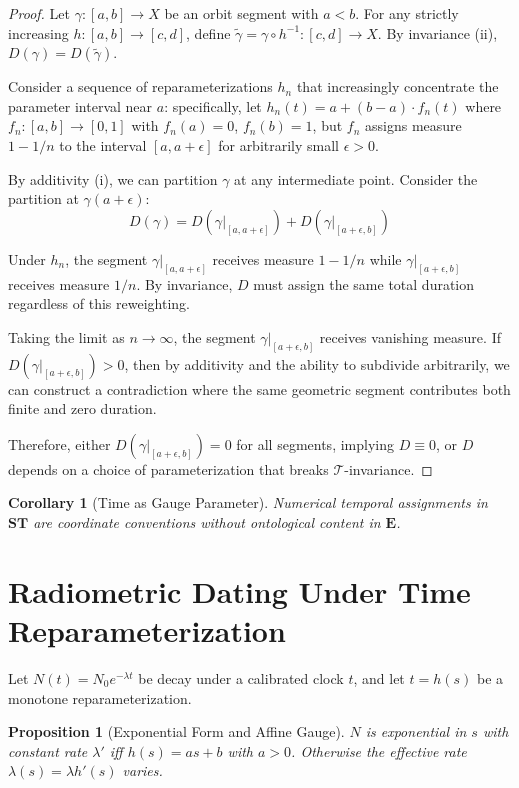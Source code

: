 \documentclass[11pt]{article}
\theoremstyle{definition}
\theoremstyle{plain}
\newtheorem{proposition}[definition]{Proposition}
\newtheorem{corollary}[definition]{Corollary}
\theoremstyle{remark}
\newcommand{\Ecat}{\mathbf{E}}      %
\newcommand{\ST}{\mathbf{ST}}       %
\begin{document}
\begin{proof}
Let $\gamma:[a,b]\to X$ be an orbit segment with $a < b$. For any strictly increasing $h: [a,b] \to [c,d]$, define $\tilde{\gamma} = \gamma \circ h^{-1}: [c,d] \to X$. By invariance (ii), $D(\gamma) = D(\tilde{\gamma})$.

Consider a sequence of reparameterizations $h_n$ that increasingly concentrate the parameter interval near $a$: specifically, let $h_n(t) = a + (b-a) \cdot f_n(t)$ where $f_n: [a,b] \to [0,1]$ with $f_n(a) = 0$, $f_n(b) = 1$, but $f_n$ assigns measure $1-1/n$ to the interval $[a, a+\epsilon]$ for arbitrarily small $\epsilon > 0$.

By additivity (i), we can partition $\gamma$ at any intermediate point. Consider the partition at $\gamma(a+\epsilon)$:
$$D(\gamma) = D(\gamma|_{[a,a+\epsilon]}) + D(\gamma|_{[a+\epsilon,b]})$$

Under $h_n$, the segment $\gamma|_{[a,a+\epsilon]}$ receives measure $1-1/n$ while $\gamma|_{[a+\epsilon,b]}$ receives measure $1/n$. By invariance, $D$ must assign the same total duration regardless of this reweighting.

Taking the limit as $n \to \infty$, the segment $\gamma|_{[a+\epsilon,b]}$ receives vanishing measure. If $D(\gamma|_{[a+\epsilon,b]}) > 0$, then by additivity and the ability to subdivide arbitrarily, we can construct a contradiction where the same geometric segment contributes both finite and zero duration.

Therefore, either $D(\gamma|_{[a+\epsilon,b]}) = 0$ for all segments, implying $D \equiv 0$, or $D$ depends on a choice of parameterization that breaks $\mathcal{T}$-invariance.
\end{proof}

\begin{corollary}[Time as Gauge Parameter]
Numerical temporal assignments in $\ST$ are coordinate conventions without ontological content in $\Ecat$.
\end{corollary}

\section{Radiometric Dating Under Time Reparameterization}
Let $N(t)=N_0 e^{-\lambda t}$ be decay under a calibrated clock $t$, and let $t=h(s)$ be a monotone reparameterization.

\begin{proposition}[Exponential Form and Affine Gauge]
$N$ is exponential in $s$ with constant rate $\lambda'$ iff $h(s)=a s+b$ with $a>0$. Otherwise the effective rate $\lambda(s)=\lambda h'(s)$ varies.
\end{proposition}
\end{document}
